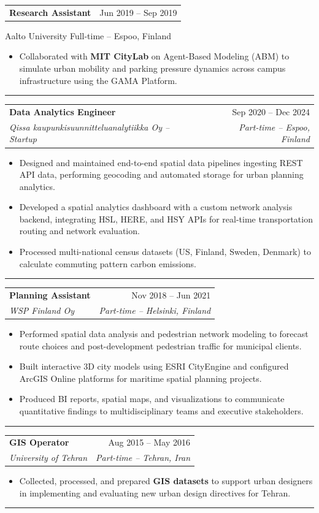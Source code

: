 \documentclass[a4paper,11pt]{article}
\makeatletter
\newcommand{\resumeItem}[1]{
  \item\small{#1}
}
\newcommand{\resumeItemListStart}{\begin{itemize}[rightmargin=0.11in]}
\newcommand{\resumeItemListEnd}{\end{itemize}}
\newcommand{\resumeQuadHeading}[4]{
  \item
  \begin{tabular*}{0.96\textwidth}[t]{l@{\extracolsep{\fill}}r}
    \textbf{#1} & #2 \\
    \textit{\small#3} & \textit{\small #4} \\
  \end{tabular*}
}
\newcommand{\resumeQuadHeadingChild}[2]{
  \item
  \begin{tabular*}{0.96\textwidth}[t]{l@{\extracolsep{\fill}}r}
    \textbf{\small#1} & {\small#2} \\
  \end{tabular*}
}
\makeatother
\begin{document}
\resumeQuadHeadingChild{Research Assistant}{Jun 2019 -- Sep 2019}
{Aalto University}{ Full-time -- Espoo, Finland}
\resumeItemListStart
    \resumeItem{Collaborated with \textbf{MIT CityLab} on Agent-Based Modeling (ABM) to simulate urban mobility and parking pressure dynamics across campus infrastructure using the GAMA Platform.}
\resumeItemListEnd

\noindent\rule{0.5\linewidth}{0.4pt}



\resumeQuadHeading{Data Analytics Engineer}{Sep 2020 -- Dec 2024}
{Qissa kaupunkisuunnitteluanalytiikka Oy -- Startup}{Part-time -- Espoo, Finland}

\resumeItemListStart
    \resumeItem{Designed and maintained end-to-end spatial data pipelines ingesting REST API data, performing geocoding and automated storage for urban planning analytics.}
    \resumeItem{Developed a spatial analytics dashboard with a custom network analysis backend, integrating HSL, HERE, and HSY APIs for real-time transportation routing and network evaluation.}
    \resumeItem{Processed multi-national census datasets (US, Finland, Sweden, Denmark) to calculate commuting pattern carbon emissions.}
\resumeItemListEnd

\noindent\rule{0.5\linewidth}{0.4pt}


\resumeQuadHeading{Planning Assistant}{Nov 2018 -- Jun 2021}
{WSP Finland Oy}{Part-time -- Helsinki, Finland}

\resumeItemListStart
    \resumeItem{Performed spatial data analysis and pedestrian network modeling to forecast route choices and post-development pedestrian traffic for municipal clients.}
    \resumeItem{Built interactive 3D city models using ESRI CityEngine and configured ArcGIS Online platforms for maritime spatial planning projects.}
    \resumeItem{Produced BI reports, spatial maps, and visualizations to communicate quantitative findings to multidisciplinary teams and executive stakeholders.}
\resumeItemListEnd

\noindent\rule{0.5\linewidth}{0.4pt}

\resumeQuadHeading{GIS Operator}{Aug 2015 -- May 2016}
{University of Tehran}{Part-time -- Tehran, Iran}
\resumeItemListStart{}
\resumeItem{Collected, processed, and prepared \textbf{GIS datasets} to support urban designers in implementing and evaluating new urban design directives for Tehran.}
\resumeItemListEnd{}
\noindent\rule{0.5\linewidth}{0.4pt}
\end{document}

